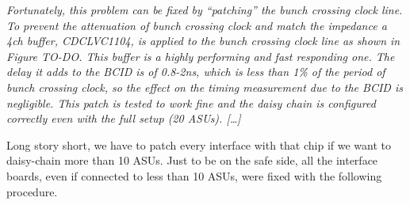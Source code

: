 \textit{Fortunately, this problem can be fixed by ``patching'' the
  bunch crossing clock line. To prevent the attenuation of bunch
  crossing clock and match the impedance a 4ch buffer,
  CDCLVC1104\cite{Texas-Instruments:CDCLVC11xx}, is applied to the
  bunch crossing clock line as shown in Figure TO-DO. This buffer is a
  highly performing and fast responding one. The delay it adds to the
  BCID is of 0.8-2ns, which is less than 1\% of the period of bunch
  crossing clock, so the effect on the timing measurement due to the
  BCID is negligible. This patch is tested to work fine and the daisy
  chain is configured correctly even with the full setup (20
  ASUs). [\dots]}

Long story short, we have to patch every interface with that chip if
we want to daisy-chain more than 10 ASUs. Just to be on the safe side,
all the interface boards, even if connected to less than 10 ASUs, were
fixed with the following procedure.

